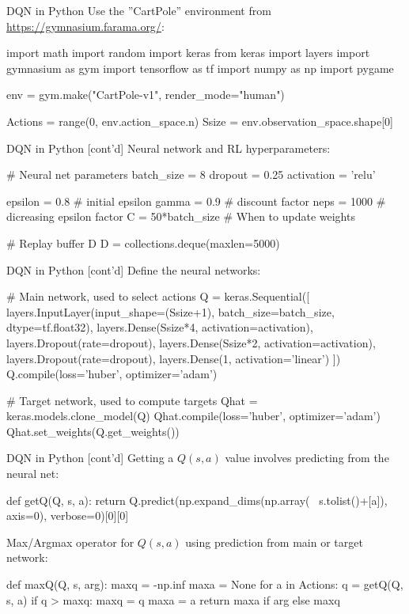 \documentclass[ignorenonframetext,xcolor=x11names]{beamer}
\begin{document}
\begin{frame}[fragile]{DQN in Python}
Use the ''CartPole'' environment from \url{https://gymnasium.farama.org/}:
\begin{pythoncode}
import math
import random
import keras
from keras import layers
import gymnasium as gym
import tensorflow as tf
import numpy as np
import pygame

env = gym.make("CartPole-v1", render_mode="human")

Actions = range(0, env.action_space.n)
Ssize = env.observation_space.shape[0]
\end{pythoncode}
\end{frame}


\begin{frame}[fragile]{DQN in Python \small [cont'd]}
Neural network and RL hyperparameters:
\begin{pythoncode}
# Neural net parameters
batch_size = 8
dropout = 0.25
activation = 'relu'

epsilon = 0.8 # initial epsilon
gamma = 0.9 # discount factor
neps = 1000 # dicreasing epsilon factor
C = 50*batch_size # When to update weights

# Replay buffer D
D = collections.deque(maxlen=5000)
\end{pythoncode}
\end{frame}

\begin{frame}[fragile]{DQN in Python \small [cont'd]}
Define the neural networks:
\begin{pythoncode}
# Main network, used to select actions
Q = keras.Sequential([
    layers.InputLayer(input_shape=(Ssize+1),
                      batch_size=batch_size,
                      dtype=tf.float32),
    layers.Dense(Ssize*4, activation=activation),
    layers.Dropout(rate=dropout),
    layers.Dense(Ssize*2, activation=activation),
    layers.Dropout(rate=dropout),
    layers.Dense(1, activation='linear')
])
Q.compile(loss='huber', optimizer='adam')

# Target network, used to compute targets
Qhat = keras.models.clone_model(Q)
Qhat.compile(loss='huber', optimizer='adam')
Qhat.set_weights(Q.get_weights())
\end{pythoncode}
\end{frame}

\begin{frame}[fragile]{DQN in Python \small [cont'd]}
Getting a $Q(s, a)$ value involves predicting from the neural net:
\begin{pythoncode}
def getQ(Q, s, a):
    return Q.predict(np.expand_dims(np.array( \
        s.tolist()+[a]), axis=0), verbose=0)[0][0]
\end{pythoncode}
Max/Argmax operator for $Q(s, a)$ using prediction from main or target network:
\begin{pythoncode}
def maxQ(Q, s, arg):
    maxq = -np.inf
    maxa = None
    for a in Actions:
        q = getQ(Q, s, a)
        if q > maxq:
            maxq = q
            maxa = a
    return maxa if arg else maxq
\end{pythoncode}
\end{frame}
\end{document}
